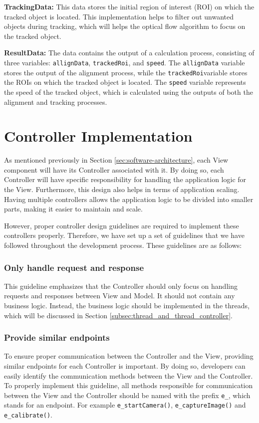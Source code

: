 \textbf{TrackingData:} This data stores the initial region of interest (ROI) on which the tracked object is located. This implementation helps to filter out unwanted objects during tracking, which will helps the optical flow algorithm to focus on the tracked object.

\textbf{ResultData:} The data contains the output of a calculation process, consisting of three variables: \texttt{allignData}, \texttt{trackedRoi}, and \texttt{speed}. The \texttt{allignData} variable stores the output of the alignment process, while the \texttt{trackedRoi}variable stores the ROIs on which the tracked object is located. The \texttt{speed} variable represents the speed of the tracked object, which is calculated using the outputs of both the alignment and tracking processes.

\section{Controller Implementation}
\label{sec:controller_implementation}

As mentioned previously in Section \ref{sec:software-architecture}, each View component will have its Controller associated with it. By doing so, each Controller will have specific responsibility for handling the application logic for the View. Furthermore, this design also helps in terms of application scaling. Having multiple controllers allows the application logic to be divided into smaller parts, making it easier to maintain and scale.

However, proper controller design guidelines are required to implement these controllers properly. Therefore, we have set up a set of guidelines that we have followed throughout the development process. These guidelines are as follows:

\subsubsection{Only handle request and response}
This guideline emphasizes that the Controller should only focus on handling requests and responses between View and Model. It should not contain any business logic. Instead, the business logic should be implemented in the threads, which will be discussed in Section \ref{subsec:thread_and_thread_controller}.

\subsubsection{Provide similar endpoints}
To ensure proper communication between the Controller and the View, providing similar endpoints for each Controller is important. By doing so, developers can easily identify the communication methods between the View and the Controller. To properly implement this guideline, all methods responsible for communication between the View and the Controller should be named with the prefix \texttt{e\_}, which stands for an endpoint. For example \texttt{e\_startCamera()}, \texttt{e\_captureImage()} and \texttt{e\_calibrate()}.

